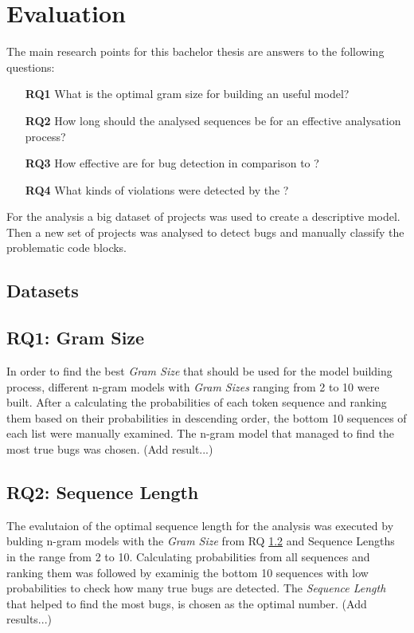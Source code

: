 \chapter{Evaluation}\label{chap:evaluation}
The main research points for this bachelor thesis are answers to the following questions:
\begin{itemize}
\item[\textbf{RQ1}] What is the optimal gram size for building an useful model?
\item[\textbf{RQ2}] How long should the analysed sequences be for an effective analysation process?
\item[\textbf{RQ3}] How effective are \ngram{} for bug detection in comparison to \litterbox{}?
\item[\textbf{RQ4}] What kinds of violations were detected by the \ngram{}?
\end{itemize}
For the analysis a big dataset of  projects was used to create a descriptive model. Then a new set of projects was analysed to detect bugs and manually classify the problematic code blocks.


\section{Datasets}\label{sec:dataset}


\section{RQ1: Gram Size}\label{sec:gram_size}
In order to find the best \emph{Gram Size} that should be used for the model building process, different n-gram models with \emph{Gram Sizes} ranging from 2 to 10 were built. After a calculating the probabilities of each token sequence and ranking them based on their probabilities in descending order, the bottom 10 sequences of each list were manually examined. The n-gram model that managed to find the most true bugs was chosen. (Add result...)


\section{RQ2: Sequence Length}\label{sec:sequence_length}
The evalutaion of the optimal sequence length for the analysis was executed by bulding n-gram models with the \emph{Gram Size} from RQ \ref{sec:gram_size} and {Sequence Lengths} in the range from 2 to 10. Calculating probabilities from all sequences and ranking them was followed by examinig the bottom 10 sequences with low probabilities to check how many true bugs are detected. The \emph{Sequence Length} that helped to find the most bugs, is chosen as the optimal number. (Add results...)


